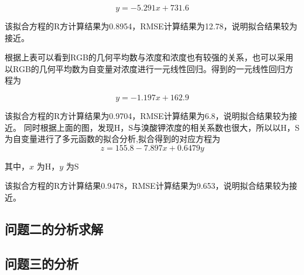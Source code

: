     $$y = -5.291 x + 731.6$$

    该拟合方程的R方计算结果为0.8954，RMSE计算结果为12.78，说明拟合结果较为接近。

    根据上表可以看到RGB的几何平均数与浓度和浓度也有较强的关系，也可以采用以RGB的几何平均数为自变量对浓度进行一元线性回归。得到的一元线性回归方程为

    $$y = -1.197 x + 162.9$$
    
    该拟合方程的R方计算结果为0.9704，RMSE计算结果为6.8，说明拟合结果较为接近。
    同时根据上面的图，发现H，S与溴酸钾浓度的相关系数也很大，所以以H，S为自变量进行了多元函数的拟合分析,拟合得到的对应方程为
    $$ z = 155.8 -7.897 x + 0.6479y $$
    
    其中，$x$ 为H，$y$ 为S

    该拟合方程的R方计算结果0.9478，RMSE计算结果为9.653，说明拟合结果较为接近。
    


\subsection{问题二的分析求解}

\subsection{问题三的分析}
